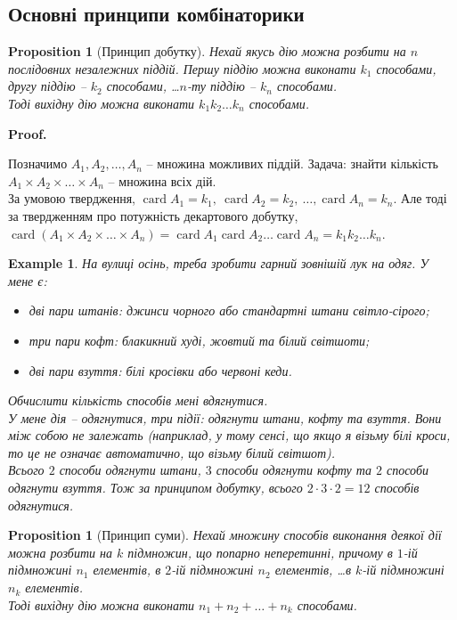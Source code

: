 \documentclass[a4paper, 14pt]{extarticle}
\makeatletter
\theoremstyle{theoremdd}
\theoremstyle{theoremdd}
\theoremstyle{theoremdd}
\theoremstyle{theoremdd}
\theoremstyle{theoremdd}
\newtheorem{example}[theorem]{Example}
\theoremstyle{theoremdd}
\theoremstyle{theoremdd}
\theoremstyle{theoremdd}
\theoremstyle{theoremdd}
\newtheorem{proposition}[theorem]{Proposition}
\theoremstyle{theoremdd}
\theoremstyle{theoremdd}
\theoremstyle{theoremdd}
\theoremstyle{theoremdd}
\theoremstyle{theoremdd}
\theoremstyle{theoremdd}
\renewenvironment{proof}[1][Proof.\\]{\par
\pushQED{\hfill \qed}%
\normalfont \topsep6\p@\@plus6\p@\relax
\trivlist
\item\relax
{\bfseries
#1\@addpunct{.}}\hspace\labelsep\ignorespaces
}{%
\popQED\endtrivlist\@endpefalse
}
\DeclareMathOperator{\card}{card}
\makeatother
\begin{document}
\subsection{Основні принципи комбінаторики}
\begin{proposition}[Принцип добутку]
Нехай якусь дію можна розбити на $n$ послідовних незалежних піддій. Першу піддію можна виконати $k_1$ способами, другу піддію -- $k_2$ способами, \dots $n$-ту піддію -- $k_n$ способами.\\
Тоді вихідну дію можна виконати $k_1 k_2 \dots k_n$ способами.
\end{proposition}

\begin{proof}
Позначимо $A_1,A_2,\dots,A_n$ -- множина можливих піддій. Задача: знайти кількість $A_1 \times A_2 \times \dots \times A_n$ -- множина всіх дій. \\
За умовою твердження, $\card A_1 = k_1,\ \card A_2 = k_2,\ \dots, \card A_n = k_n$. Але тоді за твердженням про потужність декартового добутку,\\
$\card(A_1 \times A_2 \times \dots \times A_n) = \card A_1 \card A_2 \dots \card A_n = k_1 k_2 \dots k_n$.
\end{proof}

\begin{example}
На вулиці осінь, треба зробити гарний зовнішій лук на одяг. У мене є:
\begin{itemize}[nosep, wide=0pt, label={-}]
\item дві пари штанів: джинси чорного або стандартні штани світло-сірого;
\item три пари кофт: блакикний худі, жовтий та білий світшоти;
\item дві пари взуття: білі кросівки або червоні кеди.
\end{itemize}
Обчислити кількість способів мені вдягнутися.
\bigskip \\
У мене дія -- одягнутися, три підії: одягнути штани, кофту та взуття. Вони між собою не залежать (наприклад, у тому сенсі, що якщо я візьму білі кроси, то це не означає автоматично, що візьму білий світшот).\\
Всього $2$ способи одягнути штани, $3$ способи одягнути кофту та $2$ способи одягнути взуття. Тож за принципом добутку, всього $2 \cdot 3 \cdot 2 = 12$ способів одягнутися.
\end{example}

\begin{proposition}[Принцип суми]
Нехай множину способів виконання деякої дії можна розбити на $k$ підмножин, що попарно неперетинні, причому в $1$-ій підмножині $n_1$ елементів, в $2$-ій підмножині $n_2$ елементів, \dots в $k$-ій підмножині $n_k$ елементів.\\
Тоді вихідну дію можна виконати $n_1 + n_2 + \dots + n_k$ способами.
\end{proposition}
\end{document}
